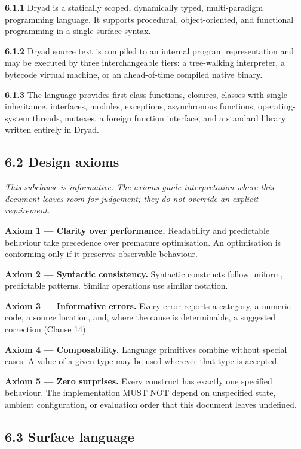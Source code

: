 \documentclass[
  english,
  11pt,
  a4paper,
]{article}
\begin{document}
\textbf{6.1.1} Dryad is a statically scoped, dynamically typed,
multi-paradigm programming language. It supports procedural,
object-oriented, and functional programming in a single surface syntax.

\textbf{6.1.2} Dryad source text is compiled to an internal program
representation and may be executed by three interchangeable tiers: a
tree-walking interpreter, a bytecode virtual machine, or an
ahead-of-time compiled native binary.

\textbf{6.1.3} The language provides first-class functions, closures,
classes with single inheritance, interfaces, modules, exceptions,
asynchronous functions, operating-system threads, mutexes, a foreign
function interface, and a standard library written entirely in Dryad.

\subsection{6.2 Design axioms}\label{design-axioms}

\emph{This subclause is informative. The axioms guide interpretation
where this document leaves room for judgement; they do not override an
explicit requirement.}

\textbf{Axiom 1 --- Clarity over performance.} Readability and
predictable behaviour take precedence over premature optimisation. An
optimisation is conforming only if it preserves observable behaviour.

\textbf{Axiom 2 --- Syntactic consistency.} Syntactic constructs follow
uniform, predictable patterns. Similar operations use similar notation.

\textbf{Axiom 3 --- Informative errors.} Every error reports a category,
a numeric code, a source location, and, where the cause is determinable,
a suggested correction (Clause 14).

\textbf{Axiom 4 --- Composability.} Language primitives combine without
special cases. A value of a given type may be used wherever that type is
accepted.

\textbf{Axiom 5 --- Zero surprises.} Every construct has exactly one
specified behaviour. The implementation MUST NOT depend on unspecified
state, ambient configuration, or evaluation order that this document
leaves undefined.

\subsection{6.3 Surface language}\label{surface-language}
\end{document}
